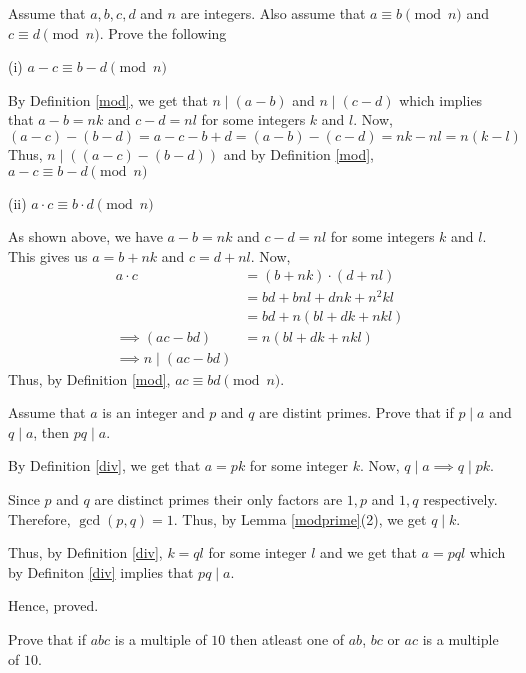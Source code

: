 \begin{problem}
	Assume that $a, b, c, d$ and $n$ are integers. Also assume that $a \equiv b \pmod{n}$ and $c \equiv d \pmod n$. Prove the following

	(i) $a-c \equiv b-d \pmod{n}$
	\begin{solution}
		By Definition \ref{mod}, we get that $n \mid (a-b)$ and $n \mid (c-d)$ which implies that $a-b = nk$ and $c-d = nl$ for some integers $k$ and $l$. Now,
		$$(a-c)-(b-d) = a-c-b+d = (a-b)-(c-d) = nk-nl = n(k-l)$$
		Thus, $n \mid ((a-c)-(b-d))$ and by Definition \ref{mod}, $a-c \equiv b-d \pmod{n}$
	\end{solution}

	(ii) $a \cdot c \equiv b \cdot d \pmod{n}$
	\begin{solution}
		As shown above, we have $a-b = nk$ and $c-d = nl$ for some integers $k$ and $l$. This gives us $a = b+nk$ and $c = d+nl$. Now,
		\begin{align}
			a \cdot c &= (b + nk) \cdot (d + nl) \\
								&= bd + bnl + dnk + n^2 kl \\
								&= bd + n(bl+dk+nkl) \\
			\implies (ac - bd) &= n(bl+dk+nkl) \\
			\implies n \mid (ac - bd)
		\end{align}
		Thus, by Definition \ref{mod}, $ac \equiv bd \pmod{n}$.
	\end{solution}
\end{problem}

\begin{problem}
	Assume that $a$ is an integer and $p$ and $q$ are distint primes. Prove that if $p \mid a$ and $q \mid a$, then $pq \mid a$.
\end{problem}

\begin{solution}
	By Definition \ref{div}, we get that $a = pk$ for some integer $k$. Now, $q \mid a \implies q \mid pk$.

	Since $p$ and $q$ are distinct primes their only factors are $1,p$ and $1,q$ respectively. Therefore, $\gcd(p, q) = 1$. Thus, by Lemma \ref{modprime}(2), we get $q \mid k$.

	Thus, by Definition \ref{div}, $k = ql$ for some integer $l$ and we get that $a = pql$ which by Definiton \ref{div} implies that $pq \mid a$.

	Hence, proved.
\end{solution}

\begin{problem}
Prove that if $abc$ is a multiple of $10$ then atleast one of $ab$, $bc$ or $ac$ is a multiple of $10$.
\end{problem}

